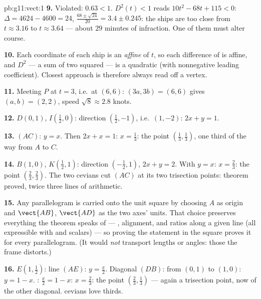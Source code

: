\begin{solution}{pb:g11:vect:1}
\textbf{9.} Violated: $0.63 < 1$. $D^2(t) < 1$ reads
$10t^2 - 68t + 115 < 0$: $\Delta = 4624 - 4600 = 24$, 
$\frac{68 \pm \sqrt{24}}{20} = 3.4 \pm 0.245$: the ships are
too close from $t \approx 3.16$ to $t \approx 3.64$ --- about
$29$ minutes of infraction. One of them must alter course.

\textbf{10.} Each coordinate of each ship is an \emph{affine}
 of $t$, so each difference of  is affine,
and $D^2$ --- a sum of two squared  --- is a
quadratic (with nonnegative leading coefficient). Closest
approach is therefore always read off a vertex.

\textbf{11.} Meeting $P$ at $t = 3$, i.e.\ at $(6, 6)$:
$(3a, 3b) = (6, 6)$ gives $(a, b) = (2, 2)$, speed
$\sqrt{8} \approx 2.8$ knots.

\textbf{12.} $D(0, 1)$, $I\left(\frac12, 0\right)$: direction
$\left(\frac12, -1\right)$, i.e.\ $(1, -2)$: 
$2x + y = 1$.

\textbf{13.} $(AC)$: $y = x$. Then $2x + x = 1$:
$x = \frac13$: the point $\left(\frac13, \frac13\right)$, one
third of the way from $A$ to $C$.

\textbf{14.} $B(1, 0)$, $K\left(\frac12, 1\right)$: direction
$\left(-\frac12, 1\right)$,  $2x + y = 2$. With
$y = x$: $x = \frac23$: the point
$\left(\frac23, \frac23\right)$. The two cevians cut $(AC)$ at
its two trisection points: theorem proved, twice three lines
of arithmetic.

\textbf{15.} Any parallelogram is carried onto the unit square
by choosing $A$ as origin and $\vect{AB}$, $\vect{AD}$ as the
two axes' units. That choice preserves everything the theorem
speaks of --- , alignment, and ratios along a given
line (all expressible with  and scalars) --- so proving
the statement in the square proves it for every parallelogram.
(It would \emph{not} transport lengths or angles: those the
frame distorts.)

\textbf{16.} $E\left(1, \frac12\right)$: line $(AE)$:
$y = \frac x2$. Diagonal $(DB)$: from $(0,1)$ to $(1,0)$:
$y = 1 - x$. : $\frac x2 = 1 - x$: $x = \frac23$:
the point $\left(\frac23, \frac13\right)$ --- again a
trisection point, now of the other diagonal.  cevians
love thirds.


\end{solution}
